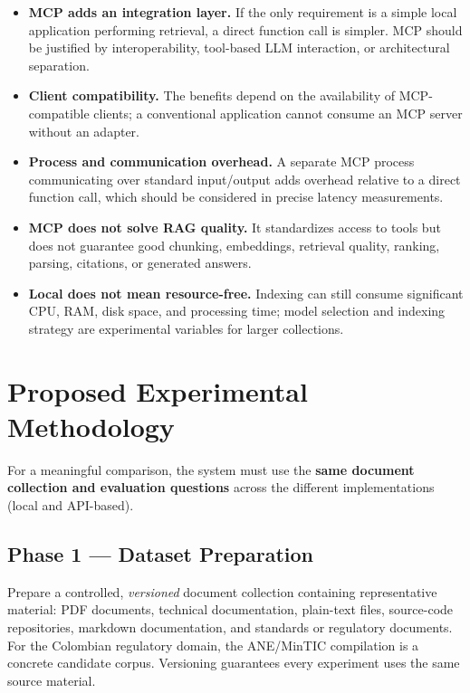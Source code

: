 \documentclass[11pt,a4paper]{article}
\begin{document}
\begin{itemize}[leftmargin=1.6em]
  \item \textbf{MCP adds an integration layer.} If the only requirement is a simple local application performing retrieval, a direct function call is simpler. MCP should be justified by interoperability, tool-based LLM interaction, or architectural separation.
  \item \textbf{Client compatibility.} The benefits depend on the availability of MCP-compatible clients; a conventional application cannot consume an MCP server without an adapter.
  \item \textbf{Process and communication overhead.} A separate MCP process communicating over standard input/output adds overhead relative to a direct function call, which should be considered in precise latency measurements.
  \item \textbf{MCP does not solve RAG quality.} It standardizes access to tools but does not guarantee good chunking, embeddings, retrieval quality, ranking, parsing, citations, or generated answers.
  \item \textbf{Local does not mean resource-free.} Indexing can still consume significant CPU, RAM, disk space, and processing time; model selection and indexing strategy are experimental variables for larger collections.
\end{itemize}

\section{Proposed Experimental Methodology}
\label{sec:methodology}

For a meaningful comparison, the system must use the \textbf{same document
collection and evaluation questions} across the different implementations
(local and API-based).

\subsection{Phase 1 --- Dataset Preparation}

Prepare a controlled, \emph{versioned} document collection containing
representative material: PDF documents, technical documentation, plain-text
files, source-code repositories, markdown documentation, and standards or
regulatory documents. For the Colombian regulatory domain, the ANE/MinTIC
compilation \cite{ane-mintic} is a concrete candidate corpus. Versioning
guarantees every experiment uses the same source material.
\end{document}
